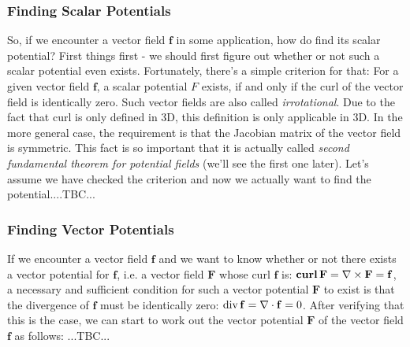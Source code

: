 




\subsubsection{Finding Scalar Potentials}
So, if we encounter a vector field $\mathbf{f}$ in some application, how do find its scalar potential? First things first - we should first figure out whether or not such a scalar potential even exists. Fortunately, there's a simple criterion for that: For a given vector field $\mathbf{f}$, a scalar potential $F$ exists, if and only if the curl of the vector field is identically zero. Such vector fields are also called \emph{irrotational}. Due to the fact that curl is only defined in 3D, this definition is only applicable in 3D. In the more general case, the requirement is that the Jacobian matrix of the vector field is symmetric. This fact is so important that it is actually called \emph{second fundamental theorem for potential fields} (we'll see the first one later). %
Let's assume we have checked the criterion and now we actually want to find the potential....TBC...


\subsubsection{Finding Vector Potentials}
If we encounter a vector field $\mathbf{f}$ and we want to know whether or not there exists a vector potential for $\mathbf{f}$, i.e. a vector field $\mathbf{F}$ whose curl $\mathbf{f}$ is: $\operatorname{\mathbf{curl}} \mathbf{F} = \nabla \times \mathbf{F} = \mathbf{f}$, a necessary and sufficient condition for such a vector potential $\mathbf{F}$ to exist is that the divergence of $\mathbf{f}$ must be identically zero: $\operatorname{div} \mathbf{f} = \nabla \cdot \mathbf{f} = 0$. After verifying that this is the case, we can start to work out the vector potential $\mathbf{F}$ of the vector field $\mathbf{f}$ as follows: ...TBC...

